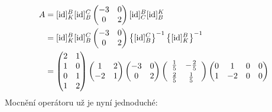 \documentclass{article}
\begin{document}
       \begin{align*}
           A &= [\text{id}]_K^B[\text{id}]_B^C\begin{pmatrix}
   -3 & 0 \\ 0 & 2
        \end{pmatrix}[\text{id}]_C^B[\text{id}]_B^K \\&= [\text{id}]_K^B[\text{id}]_B^C\begin{pmatrix}
   -3 & 0 \\ 0 & 2
        \end{pmatrix}\left\{[\text{id}]_B^C\right\}^{-1}\left\{[\text{id}]_K^B\right\}^{-1} \\&= \begin{pmatrix}
    2 & 1 \\ 1 & 0 \\ 0 & 1 \\ 1 & 2
        \end{pmatrix}\begin{pmatrix}
    1 & 2 \\ -2 & 1
        \end{pmatrix}\begin{pmatrix}
   -3 & 0 \\ 0 & 2
 \end{pmatrix}\left(\begin{array}{c c}
   \frac{1}{5} & -\frac{2}{5} \vspace{0.25em}\\ \frac{2}{5} & \frac{1}{5}
 \end{array}\right)\begin{pmatrix}
            0 & 1 & 0 & 0 \\ 1 & -2 & 0 & 0
        \end{pmatrix}
       \end{align*}
        Mocnění operátoru už je nyní jednoduché:
\end{document}
